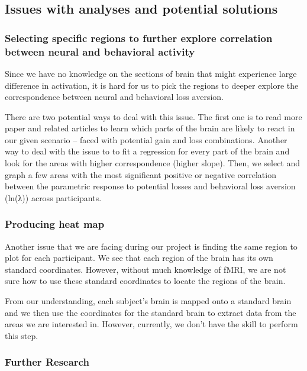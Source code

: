 \subsection{Issues with analyses and potential solutions}

\subsubsection{Selecting specific regions to further explore 
correlation between neural and behavioral activity}

\indent \indent Since we have no knowledge on the sections of brain that might 
experience large difference in activation, it is hard for us to pick the 
regions to deeper explore the correspondence between neural and behavioral loss 
aversion.

There are two potential ways to deal with this issue. The first one is to read 
more paper and related articles to learn which parts of the brain are likely to 
react in our given scenario -- faced with potential gain and loss combinations. 
Another way to deal with the issue to to fit a regression for every part of the 
brain and look for the areas with higher correspondence (higher slope). Then, 
we select and graph a few areas with the most significant positive or negative 
correlation between the parametric response to potential losses and behavioral 
loss aversion (ln(λ)) across participants.

\subsubsection{Producing heat map}

\indent \indent Another issue that we are facing during our project is finding 
the same region to plot for each participant. We see that each region of the 
brain has its own standard coordinates. However, without much knowledge of 
fMRI, we are not sure how to use these standard coordinates to locate the 
regions of the brain.

From our understanding, each subject's brain is mapped onto a standard brain 
and we then use the coordinates for the standard brain to extract data from 
the areas we are interested in. However, currently, we don't have the skill to 
perform this step.

\subsubsection{Further Research}

